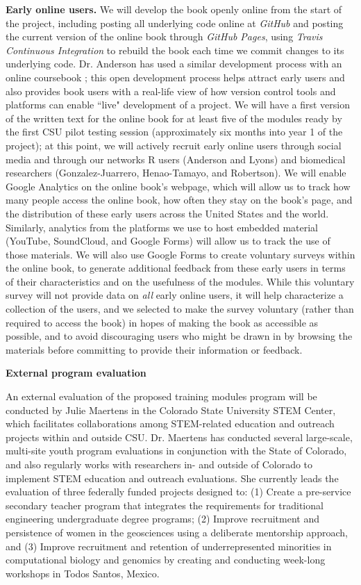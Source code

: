 \documentclass[pdftex,english,11pt,parskip=half]{scrartcl}
\begin{document}
\textbf{Early online users.}  We will develop the book openly online from the start of 
the project, including posting all underlying code online at \textit{GitHub} and 
posting the current version of the online book through \textit{GitHub Pages}, using 
\textit{Travis Continuous Integration} to rebuild the book each time we commit 
changes to its underlying code. Dr. Anderson has used a similar development process
with an online coursebook \cite{andersoncoursebook}; this open development process
helps attract early users and also provides book users with a real-life view of how 
version control tools and platforms can enable ``live" development of a project. We will 
have a first version of the written text for the online book for at least five of the 
modules ready by the first CSU pilot testing session (approximately six months into year 1 of the project); at this point, we will actively recruit early online users through
social media and through our networks R users (Anderson and Lyons) and biomedical researchers (Gonzalez-Juarrero, Henao-Tamayo, and Robertson). We will enable Google Analytics on the online book's webpage, which will allow us to track how many people 
access the online book, how often they stay on the book's page, and the distribution of these early users across the United States and the world. 
Similarly, analytics from the platforms we use to host embedded material (YouTube,
SoundCloud, and Google Forms) will allow us to track the use of those materials.
We will also use Google Forms to create voluntary surveys within the online book, to generate additional feedback from these early users in terms of their characteristics and on the usefulness of the modules.  While this voluntary survey will not provide data on \textit{all} early online users, it will help characterize a collection of the users, and we selected to make the survey voluntary (rather than required to access the book) in hopes of making the book as accessible as possible, and to avoid discouraging users who might be drawn in by browsing the materials before committing to provide their information or feedback.

\textbf{External program evaluation}

An external evaluation of the proposed training modules program will be conducted by Julie Maertens in the Colorado State University STEM Center, which facilitates collaborations among STEM-related education and outreach projects within and outside CSU. Dr. Maertens has conducted several large-scale, multi-site youth program evaluations in conjunction with the State of Colorado, and also regularly works with researchers in- and outside of Colorado to implement STEM education and outreach evaluations. She currently leads the evaluation of three federally funded projects designed to: (1) Create a pre-service secondary teacher program that integrates the requirements for traditional engineering undergraduate degree programs; (2) Improve recruitment and persistence of women in the geosciences using a deliberate mentorship approach, and (3) Improve recruitment and retention of underrepresented minorities in computational biology and genomics by creating and conducting week-long workshops in Todos Santos, Mexico.
\end{document}
